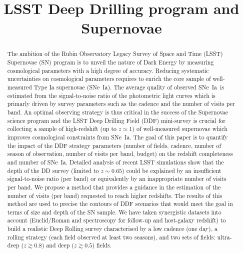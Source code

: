 \documentclass[skiphelvet,twocolumn]{aastex63}
\newcommand{\sne}{{SNe~Ia}}
\newcommand{\sn}{{SN}}
\begin{document}
\title{LSST Deep Drilling program and Supernovae}



\maketitlepre

\begin{abstract}
  
  The ambition of the Rubin Observatory Legacy Survey of Space and Time (LSST) Supernovae (\sn) program is to unveil the nature of Dark Energy by measuring cosmological parameters with a high degree of accuracy. Reducing systematic uncertainties on cosmological parameters requires to enrich the core sample of well-measured Type Ia supernovae (\sne). The average quality of observed \sne~is estimated from the signal-to-noise ratio of the photometric light curves which is primarly driven by survey parameters such as the cadence and the number of visits per band. An optimal observing strategy is thus critical in the success of the Supernovae science program and the LSST
 Deep Drilling Field (DDF) mini-survey is crucial for collecting a sample of high-redshift (up to $z\simeq$1) of well-measured supernovae which improves cosmological constraints from \sne. The goal of this paper is to quantify the impact of the DDF strategy parameters (number of fields, cadence, number of season of observation, number of visits per band, budget) on the redshift completeness and number of \sne. Detailed analysis of recent LSST simulations show that the depth of the DD survey (limited to $z\sim0.65$) could be explained by an insufficient signal-to-noise ratio (per band) or equivalently by an inappropriate number of visits per band. We propose a method that provides a guidance in the estimation of the number of visits (per band) requested to reach higher redshifts. The results of this method are used to precise the contours of DDF scenarios that would meet the goal in terms of size and depth of the SN sample. We have taken synergistic datasets into account (Euclid/Roman and spectroscopy for follow-up and host-galaxy redshift) to build a realistic Deep Rolling survey characterised by a low cadence (one day), a rolling strategy (each field observed at least two seasons), and two sets of fields: ultra-deep ($z\gtrsim0.8$) and deep ($z\gtrsim0.5$) fields.

\end{abstract}
\end{document}
